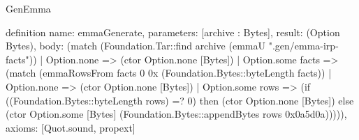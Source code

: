 \begin{lexlean}{GenEmma}
\begin{semanticmodule}
definition{
  name: emmaGenerate,
  parameters: [archive : Bytes],
  result: (Option Bytes),
  body: (match (Foundation.Tar::find archive (emmaU ".gen/emma-irp-facts"))
    | Option.none => (ctor Option.none [Bytes])
    | Option.some facts => (match (emmaRowsFrom facts 0 0x (Foundation.Bytes::byteLength facts))
      | Option.none => (ctor Option.none [Bytes])
      | Option.some rows => (if ((Foundation.Bytes::byteLength rows) =? 0) then (ctor Option.none [Bytes]) else (ctor Option.some [Bytes] (Foundation.Bytes::appendBytes rows 0x0a5d0a))))),
  axioms: [Quot.sound, propext]
}
\end{semanticmodule}
\end{lexlean}
